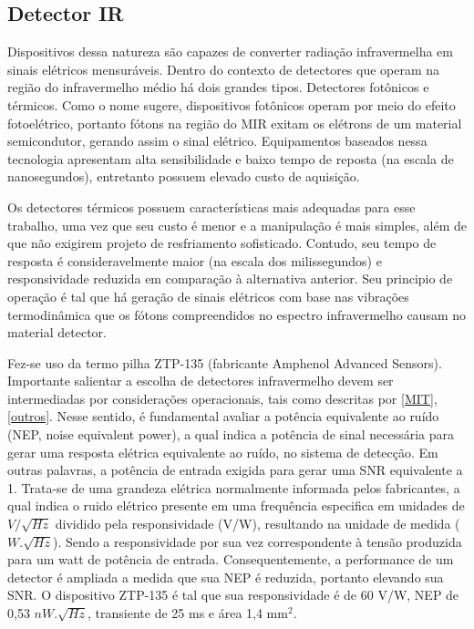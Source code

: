 \documentclass[oneside,openright,12pt]{ufsm_2021} %
\begin{document}
        \subsection{Detector IR}
            \par Dispositivos dessa natureza são capazes de converter radiação infravermelha em sinais elétricos mensuráveis. Dentro do contexto de detectores que operam na região do infravermelho médio há dois grandes tipos. Detectores fotônicos e térmicos. Como o nome sugere, dispositivos fotônicos operam por meio do efeito fotoelétrico, portanto fótons na região do MIR exitam os elétrons de um material semicondutor, gerando assim o sinal elétrico. Equipamentos baseados nessa tecnologia apresentam alta sensibilidade e baixo tempo de reposta (na escala de nanosegundos), entretanto possuem elevado custo de aquisição. 
            \par Os detectores térmicos possuem características mais adequadas para esse trabalho, uma vez que seu custo é menor e a manipulação é mais simples, além de que não exigirem projeto de resfriamento sofisticado. Contudo, seu tempo de resposta é consideravelmente maior (na escala dos milissegundos) e responsividade reduzida em comparação à alternativa anterior. Seu principio de operação é tal que há geração de sinais elétricos com base nas vibrações termodinâmica que os fótons compreendidos no espectro infravermelho causam no material detector. 
            \par Fez-se uso da termo pilha ZTP-135 (fabricante Amphenol Advanced Sensors). Importante salientar a escolha de detectores infravermelho devem ser intermediadas por considerações operacionais, tais como descritas por \ref{MIT}, \ref{outros}. Nesse sentido, é fundamental avaliar a potência equivalente ao ruído (NEP, noise equivalent power), a qual indica a potência de sinal necessária para gerar uma resposta elétrica equivalente ao ruído, no sistema de detecção. Em outras palavras, a potência de entrada exigida para gerar uma SNR equivalente a 1. Trata-se de uma grandeza elétrica normalmente informada pelos fabricantes, a qual indica o ruido elétrico presente em uma frequência especifica em unidades de $V/\sqrt{Hz}$ dividido pela responsividade (V/W), resultando na unidade de medida ($W.\sqrt{Hz}$). Sendo a responsividade por sua vez correspondente à tensão produzida para um watt de potência de entrada. Consequentemente, a performance de um detector é ampliada a medida que sua NEP é reduzida, portanto elevando sua SNR. O dispositivo ZTP-135 é tal que sua responsividade é de 60 V/W, NEP de 0,53 $nW.\sqrt{Hz}$, transiente de 25 ms e área 1,4 mm$^2$. 
            
\end{document}

